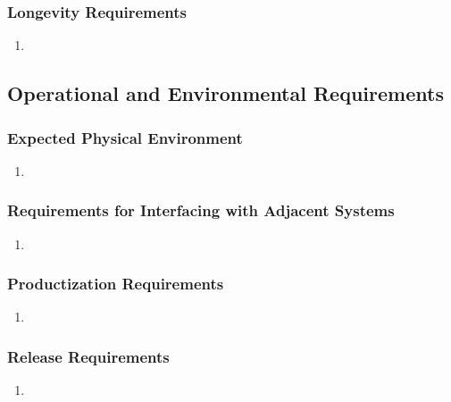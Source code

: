 \documentclass[]{article}
\begin{document}
\subsubsection{Longevity Requirements}
\label{ssub:longevity_requirements}
\begin{enumerate}[{PR}1. ]
	\item 
\end{enumerate}


\subsection{Operational and Environmental Requirements}
\label{sub:operational_and_environmental_requirements}

\subsubsection{Expected Physical Environment}
\label{ssub:expected_physical_environment}
\begin{enumerate}[{OE}1. ]
	\item 
\end{enumerate}

\subsubsection{Requirements for Interfacing with Adjacent Systems}
\label{ssub:requirements_for_interfacing_with_adjacent_systems}
\begin{enumerate}[{OE}1. ]
	\item 
\end{enumerate}

\subsubsection{Productization Requirements}
\label{ssub:productization_requirements}
\begin{enumerate}[{OE}1. ]
	\item 
\end{enumerate}

\subsubsection{Release Requirements}
\label{ssub:release_requirements}
\begin{enumerate}[{OE}1. ]
	\item 
\end{enumerate}
\end{document}
